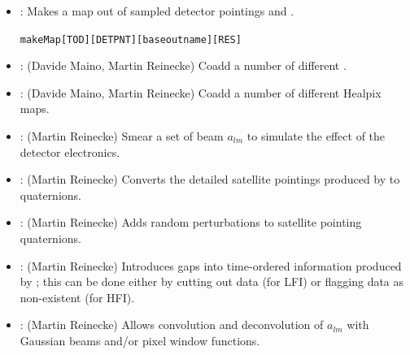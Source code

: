 \begin{itemize}
\item {}: Makes a map out of sampled detector pointings
and .

\begin{alltt}
makeMap [TOD] [DETPNT] [baseoutname] [RES]
\end{alltt}


\item {}:
(Davide Maino, Martin Reinecke) Coadd a number of different .

\begin{alltt}

\end{alltt}

\item {}:
(Davide Maino, Martin Reinecke) Coadd a number of different Healpix maps.

\begin{alltt}

\end{alltt}

\item {}:
(Martin Reinecke) Smear a set of beam $a_{lm}$ to simulate the effect
of the detector electronics.

\begin{alltt}

\end{alltt}

\item {}:
(Martin Reinecke) Converts the detailed satellite pointings produced by
 to quaternions.

\begin{alltt}

\end{alltt}

\item {}:
(Martin Reinecke) Adds random perturbations to satellite pointing quaternions.

\begin{alltt}

\end{alltt}

\item {}:
(Martin Reinecke) Introduces gaps into time-ordered information produced
by ; this can be done either by cutting out data (for LFI) or
flagging data as non-existent (for HFI).

\begin{alltt}

\end{alltt}

\item {}:
(Martin Reinecke) Allows convolution and deconvolution of $a_{lm}$ with
Gaussian beams and/or pixel window functions.

\begin{alltt}

\end{alltt}

\end{itemize}

